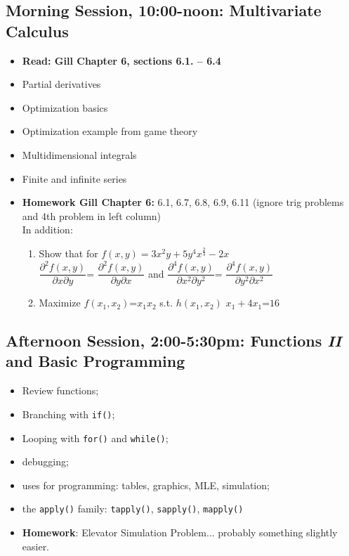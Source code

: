 \documentclass[12pt,a4paper]{article}
\begin{document}
\subsection*{Morning Session, 10:00-noon:  Multivariate Calculus}
\begin{itemize}
\setlength{\itemsep}{0pt}
\footnotesize
\item \textbf{Read: Gill Chapter 6, sections 6.1. -- 6.4}
\item Partial derivatives
\item Optimization basics
\item Optimization example from game theory
\item Multidimensional integrals
\item Finite and infinite series
\item \textbf{Homework Gill Chapter 6:} 6.1, 6.7, 6.8, 6.9,  6.11 (ignore trig problems and 4th problem in left column) \\ In addition: 
\begin{enumerate} 
\item Show that for $f(x,y) = 3x^{2}y+ 5y^{4}x^{\frac{2}{3}}-2x$\\ $\dfrac{\partial^2 f(x,y)}{\partial x \partial y}$= $\dfrac{\partial^2 f(x,y)}{\partial y \partial x}$ and  $\dfrac{\partial^4 f(x,y)}{\partial x^2 \partial y^2}$= $\dfrac{\partial^4 f(x,y)}{\partial y^2 \partial x^2}$\\
\item Maximize $f(x_1, x_2)$=$x_1x_2$ s.t. $h(x_1, x_2)$ $x_1+4x_1$=$16$
\end{enumerate}


\end{itemize}




\subsection*{Afternoon Session, 2:00-5:30pm: Functions \emph{II} and Basic Programming}
\begin{itemize}
\setlength{\itemsep}{0pt}
\footnotesize
\item Review functions;
\item Branching with \texttt{if()};
\item Looping with \texttt{for()} and \texttt{while()};
\item debugging;
\item uses for programming: tables, graphics, MLE, simulation;
\item the \texttt{apply()} family: \texttt{tapply()}, \texttt{sapply()}, \texttt{mapply()}
\item \textbf{Homework}: Elevator Simulation Problem... probably something slightly easier.
\end{itemize}
\end{document}
